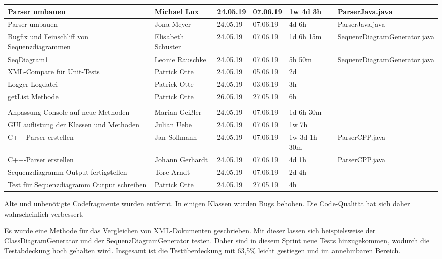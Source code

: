 \begin{longtable}{|p{4cm}|l|l|l|l|l|}
        \hline
        Parser umbauen & Michael Lux & 24.05.19 & 07.06.19 & 1w 4d 3h & ParserJava.java\\
        \hline
        Parser umbauen & Jona Meyer & 24.05.19 & 07.06.19 & 4d 6h & ParserJava.java\\
        \hline
        Bugfix und Feinschliff von Sequenzdiagrammen & Elisabeth Schuster & 24.05.19 & 07.06.19 & 1d 6h 15m & SequenzDiagramGenerator.java\\
        \hline
        SeqDiagram1 & Leonie Rauschke & 24.05.19 & 07.06.19 & 5h 50m & SequenzDiagramGenerator.java\\
        \hline 
        XML-Compare für Unit-Tests & Patrick Otte & 24.05.19 & 05.06.19 & 2d & \\
        \hline
        Logger Logdatei & Patrick Otte & 24.05.19 & 03.06.19 & 3h &\\
        \hline
        getList Methode & Patrick Otte & 26.05.19 & 27.05.19 & 6h & \\
        \hline\\
        Anpassung Console auf neue Methoden & Marian Geißler & 24.05.19 & 07.06.19 & 1d 6h 30m & \\
        \hline
        GUI auflistung der Klassen und Methoden & Julian Uebe & 24.05.19 & 07.06.19 & 1w 7h & \\
        \hline
        C++-Parser erstellen & Jan Sollmann & 24.05.19 & 07.06.19 & 1w 3d 1h 30m  & ParserCPP.java\\
        \hline
        C++-Parser erstellen & Johann Gerhardt & 24.05.19 & 07.06.19 & 4d 1h  & ParserCPP.java\\
        \hline
        Sequenzdiagramm-Output fertigstellen & Tore Arndt & 24.05.19 & 07.06.19 & 2d 4h & \\
        \hline   
        Test für Sequenzdiagramm Output schreiben & Patrick Otte & 24.05.19 & 27.05.19 & 4h & \\
        \hline     
\hline
\end{longtable}     
\nsecend

Alte und unbenötigte Codefragmente wurden entfernt. In einigen Klassen wurden Bugs behoben. Die Code-Qualität hat sich daher wahrscheinlich verbessert.
\nsecend%

Es wurde eine Methode für das Vergleichen von XML-Dokumenten geschrieben. Mit dieser lassen sich beispielsweise der ClassDiagramGenerator und der SequenzDiagramGenerator testen. Daher sind in diesem Sprint neue Tests hinzugekommen, wodurch die Testabdeckung hoch gehalten wird.
Insgesamt ist die Testüberdeckung mit 63,5\% leicht gestiegen und im annehmbaren Bereich.
\nsecend%

